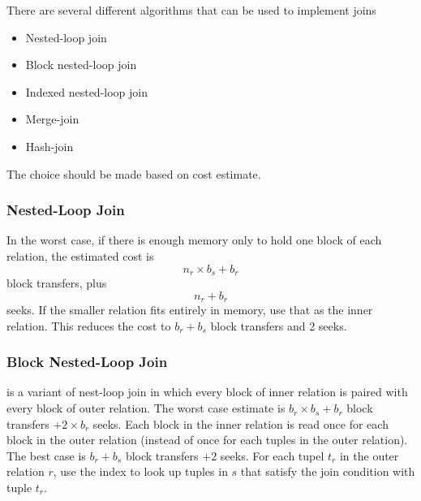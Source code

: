 \documentclass{article}
\begin{document}
There are several different algorithms that can be used to implement joins 
\begin{itemize}
  \item Nested-loop join 
  \item Block nested-loop join 
  \item Indexed nested-loop join 
  \item Merge-join 
  \item Hash-join
\end{itemize}
The choice should be made based on cost estimate. \\ 

\subsubsection{Nested-Loop Join}

In the worst case, if there is enough memory only to hold one block of each relation, the estimated cost is $$n_r \times b_s + b_r$$ block transfers, plus $$n_r + b_r$$ seeks. If the smaller relation fits entirely in memory, use that as the inner relation. This reduces the cost to $b_r + b_s$ block transfers and 2 seeks. \\ 

\subsubsection{Block Nested-Loop Join}

 is a variant of nest-loop join in which every block of inner relation is paired with every block of outer relation. The worst case estimate is $b_r \times b_s + b_r$ block transfers $+ 2 \times b_r$ seeks. Each block in the inner relation is read once for each block in the outer relation (instead of once for each tuples in the outer relation). The best case is $b_r + b_s$ block transfers $+ 2$ seeks. For each tupel $t_r$ in the outer relation $r$, use the index to look up tuples in $s$ that satisfy the join condition with tuple $t_r$. 
\end{document}
